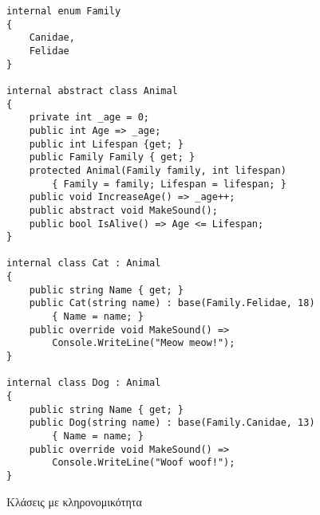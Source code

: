 \begin{listing}[H]
\begin{verbatim}
internal enum Family
{
    Canidae,
    Felidae
}

internal abstract class Animal
{
    private int _age = 0;
    public int Age => _age;
    public int Lifespan {get; }
    public Family Family { get; }
    protected Animal(Family family, int lifespan) 
        { Family = family; Lifespan = lifespan; }
    public void IncreaseAge() => _age++;
    public abstract void MakeSound();
    public bool IsAlive() => Age <= Lifespan;
}

internal class Cat : Animal
{
    public string Name { get; }
    public Cat(string name) : base(Family.Felidae, 18)
        { Name = name; }
    public override void MakeSound() => 
        Console.WriteLine("Meow meow!");
}

internal class Dog : Animal
{
    public string Name { get; }
    public Dog(string name) : base(Family.Canidae, 13)
        { Name = name; }
    public override void MakeSound() => 
        Console.WriteLine("Woof woof!");
}
\end{verbatim}
\caption{Κλάσεις με κληρονομικότητα}
\label{inheritanceClasses}
\end{listing}